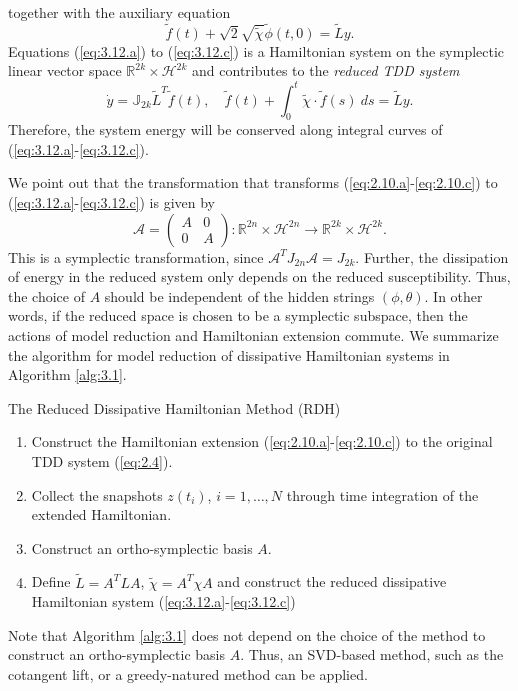 together with the auxiliary equation
\begin{equation} \label{eq:3.13}
	\tilde f(t) + \sqrt{2} \sqrt{\tilde \chi} \tilde \phi(t,0) = \tilde L y.
\end{equation}
Equations (\ref{eq:3.12.a}) to (\ref{eq:3.12.c}) is a Hamiltonian system on the symplectic linear vector space $\mathbb R^{2k} \times \mathcal H^{2k}$ and contributes to the \emph{reduced TDD system}
\begin{equation}
	\dot {y} = \mathbb J_{2k} \tilde L^T \tilde f(t), \quad \tilde f(t) + \int_0^t \tilde \chi\cdot \tilde f(s)\ ds = \tilde L y.
\end{equation}
Therefore, the system energy will be conserved along integral curves of (\ref{eq:3.12.a}-\ref{eq:3.12.c}).

We point out that the transformation that transforms (\ref{eq:2.10.a}-\ref{eq:2.10.c}) to (\ref{eq:3.12.a}-\ref{eq:3.12.c}) is given by
\begin{equation}
	\mathcal A = \begin{pmatrix}
		A& 0 \\
		0& A
	\end{pmatrix} : \mathbb R^{2n} \times \mathcal H^{2n} \to \mathbb R^{2k} \times \mathcal H^{2k}.
\end{equation}
This is a symplectic transformation, since $\mathcal A^T J_{2n} \mathcal A = J_{2k}$. Further, the dissipation of energy in the reduced system only depends on the reduced susceptibility. Thus, the choice of $A$ should be independent of the hidden strings $(\phi, \theta)$. In other words, if the reduced space is chosen to be a symplectic subspace, then the actions of model reduction and Hamiltonian extension commute. We summarize the algorithm for model reduction of dissipative Hamiltonian systems in Algorithm \ref{alg:3.1}.

\begin{algorithm}
\caption{The Reduced Dissipative Hamiltonian Method (RDH)} \label{alg:3.1}
\begin{enumerate}
	\item Construct the Hamiltonian extension (\ref{eq:2.10.a}-\ref{eq:2.10.c}) to the original TDD system (\ref{eq:2.4}).
	\item Collect the snapshots $z(t_i)$, $i=1,\dots,N$ through time integration of the extended Hamiltonian.
	\item Construct an ortho-symplectic basis $A$.
	\item Define $\tilde L = A^T L A$, $\tilde \chi = A^T \chi A$ and construct the reduced dissipative Hamiltonian system (\ref{eq:3.12.a}-\ref{eq:3.12.c})
\end{enumerate}
\end{algorithm}

Note that Algorithm \ref{alg:3.1} does not depend on the choice of the method to construct an ortho-symplectic basis $A$. Thus, an SVD-based method, such as the cotangent lift, or a greedy-natured method can be applied.
